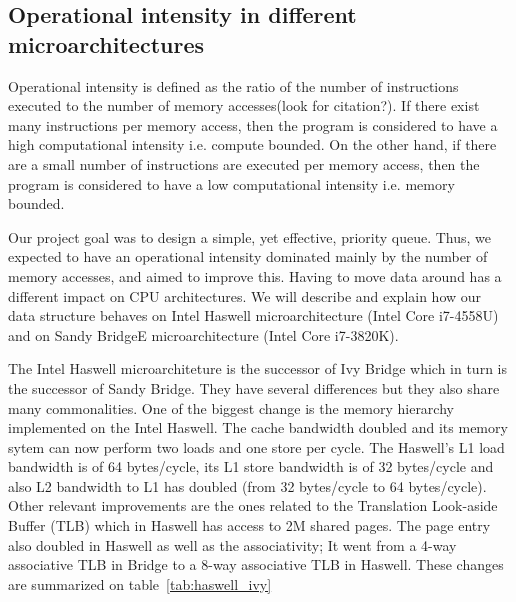 \subsection{Operational intensity in different microarchitectures}
Operational intensity is defined as the ratio of the number of instructions executed to the number of memory accesses(look for citation?). If there exist many instructions per memory access, then the program is considered to have a high computational intensity i.e. compute bounded. On the other hand, if there are a small number of instructions are executed per memory access, then the program is considered to have a low computational intensity i.e. memory bounded.

Our project goal was to design a simple, yet effective, priority queue. Thus, we expected to have an operational intensity dominated mainly by the number of memory accesses, and aimed to improve this. Having to move data around has a different impact on CPU architectures. We will describe and explain how our data structure behaves on Intel Haswell microarchitecture (Intel Core i7-4558U) and on Sandy BridgeE microarchitecture (Intel Core i7-3820K). 

The Intel Haswell microarchiteture is the successor of Ivy Bridge which in turn is the successor of Sandy Bridge. They have several differences but they also share many commonalities. One of the biggest change is the memory hierarchy implemented on the Intel Haswell. The cache bandwidth doubled and its memory sytem can now perform two loads and one store per cycle. The Haswell's L1 load bandwidth is of 64 bytes/cycle, its L1 store bandwidth is of 32 bytes/cycle and also L2 bandwidth to L1 has doubled (from 32 bytes/cycle to 64 bytes/cycle). Other relevant improvements are the ones related to the Translation Look-aside Buffer (TLB) which in Haswell has access to 2M shared pages. The page entry also doubled in Haswell as well as the associativity; It went from a 4-way associative TLB in 
 Bridge to a 8-way associative TLB in Haswell. These changes are summarized on table~\ref{tab:haswell_ivy}~\cite{ijcsit2013040321, microarchitecture, haswell_arch}

